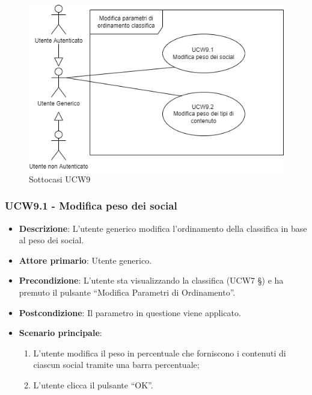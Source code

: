 \begin{figure}[!h]
\centering
    \includegraphics[scale=0.5]{UC_images/UCW9-.png}
    \caption{Sottocasi UCW9}
\end{figure}

\subsubsection{UCW9.1 - Modifica peso dei social }
\begin{itemize}
	\item \textbf{Descrizione}: L'utente generico modifica l'ordinamento della classifica in base al peso dei social.
    \item \textbf{Attore primario}: Utente generico.
    \item \textbf{Precondizione}: L’utente sta visualizzando la classifica (UCW7 §) e ha premuto il pulsante “Modifica Parametri di Ordinamento”.
    \item \textbf{Postcondizione}: Il parametro in questione viene applicato.
    \item \textbf{Scenario principale}: 
    \begin{enumerate}
        \item L’utente modifica il peso in percentuale che forniscono i contenuti di ciascun social tramite una barra percentuale;
        \item L’utente clicca il pulsante “OK”.
    \end{enumerate}
\end{itemize}

